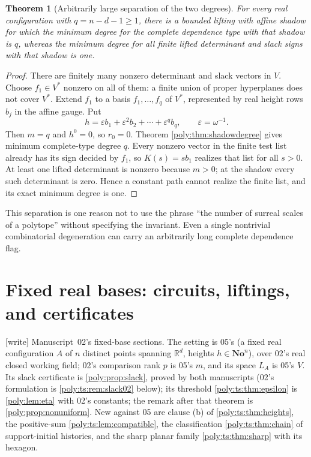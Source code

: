 \documentclass[11pt,a4paper]{article}
\numberwithin{equation}{section}
\newtheorem{theorem}{Theorem}[section]
\theoremstyle{plain}
\newcommand{\wtag}{\textup{[write]}}%
\newcommand{\No}{\mathbf{No}}
\newcommand{\R}{\mathbb R}
\newcommand{\eps}{\varepsilon}
\begin{document}
\begin{theorem}[Arbitrarily large separation of the two degrees]
\label{poly:thm:separation}
For every real configuration with $q=n-d-1\ge1$, there is a bounded
lifting with affine shadow for which the minimum degree for the complete
dependence type with that shadow is $q$, whereas the minimum degree for
all finite lifted determinant and slack signs with that shadow is one.
\end{theorem}
\begin{proof}
There are finitely many nonzero determinant and slack vectors in $V$.
Choose $f_1\in V^*$ nonzero on all of them: a finite union of proper
hyperplanes does not cover $V^*$. Extend $f_1$ to a basis
$f_1,\ldots,f_q$ of $V^*$, represented by real height rows $b_j$ in the
affine gauge. Put
\[
 h=\eps b_1+\eps^2 b_2+\cdots+\eps^q b_q,
 \qquad \eps=\omega^{-1}.
\]
Then $m=q$ and $h^0=0$, so $r_0=0$. Theorem
\ref{poly:thm:shadowdegree} gives minimum complete-type degree $q$.
Every nonzero vector in the finite test list already has its sign decided
by $f_1$, so $K(s)=sb_1$ realizes that list for all $s>0$. At least one
lifted determinant is nonzero because $m>0$; at the shadow every such
determinant is zero. Hence a constant path cannot realize the finite list,
and its exact minimum degree is one.
\end{proof}

This separation is one reason not to use the phrase ``the number of
surreal scales of a polytope'' without specifying the invariant. Even a
single nontrivial combinatorial degeneration can carry an arbitrarily long
complete dependence flag.

\section{Fixed real bases: circuits, liftings, and certificates}\label{poly:ts:sec:liftings}
\noindent\wtag{} Manuscript~02's fixed-base sections. The setting is
05's (a fixed real configuration $A$ of $n$ distinct points spanning
$\R^d$, heights $h\in\No^n$), over 02's real closed working field; 02's
comparison rank $p$ is 05's $m$, and its space $L_A$ is 05's $V$. Its slack
certificate is \cref{poly:prop:slack}, proved by both manuscripts (02's
formulation is \cref{poly:ts:rem:slack02} below); its threshold
\cref{poly:ts:thm:epsilon} is \cref{poly:lem:eta} with 02's constants; the
remark after that theorem is \cref{poly:prop:nonuniform}. New against 05
are clause (b) of \cref{poly:ts:thm:heights}, the positive-sum
\cref{poly:ts:lem:compatible}, the classification \cref{poly:ts:thm:chain} of
support-initial histories, and the sharp planar family
\cref{poly:ts:thm:sharp} with its hexagon.
\end{document}
